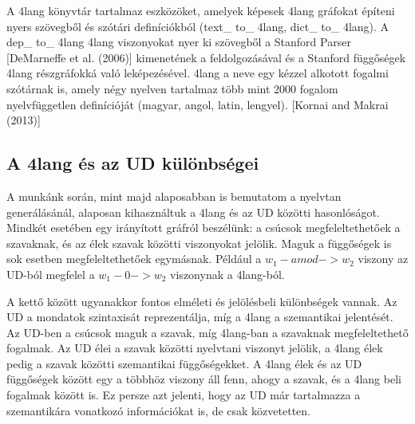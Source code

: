 A 4lang könyvtár tartalmaz eszközöket, amelyek képesek 4lang gráfokat építeni nyers szövegből és szótári definíciókból (text\_ to\_ 4lang, dict\_ to\_ 4lang). A dep\_ to\_ 4lang 4lang viszonyokat nyer ki szövegből a Stanford Parser [DeMarneffe et al. (2006)] kimenetének a feldolgozásával és a Stanford függőségek 4lang részgráfokká való leképezésével.
4lang a neve egy kézzel alkotott  fogalmi szótárnak is, amely négy nyelven tartalmaz több mint 2000 fogalom nyelvfüggetlen definícióját (magyar, angol, latin, lengyel). [Kornai and Makrai (2013)]


\subsection{A 4lang és az UD különbségei}
A munkánk során, mint majd alaposabban is bemutatom a nyelvtan generálásánál, alaposan kihasználtuk a 4lang és az UD közötti hasonlóságot. Mindkét esetében egy irányított gráfról beszélünk: a csúcsok megfeleltethetőek a szavaknak, és az élek szavak közötti viszonyokat jelölik. Maguk a függőségek is sok esetben megfeleltethetőek egymásnak. Például a \textit{$w_1 -amod-> w_2$} viszony az UD-ból megfelel a \textit{$w_1 -0-> w_2$} viszonynak a 4lang-ból.

A kettő között ugyanakkor fontos elméleti és jelölésbeli különbségek vannak. Az UD a mondatok szintaxisát reprezentálja, míg a 4lang a szemantikai jelentését. Az UD-ben a csúcsok maguk a szavak, míg 4lang-ban a szavaknak megfeleltethető fogalmak. Az UD élei a szavak közötti nyelvtani viszonyt jelölik, a 4lang élek pedig a szavak közötti szemantikai függőségekket. A 4lang élek és az UD függőségek között egy a többhöz viszony áll fenn, ahogy a szavak, és a 4lang beli fogalmak között is. Ez persze azt jelenti, hogy az UD már tartalmazza a szemantikára vonatkozó információkat is, de csak közvetetten.

